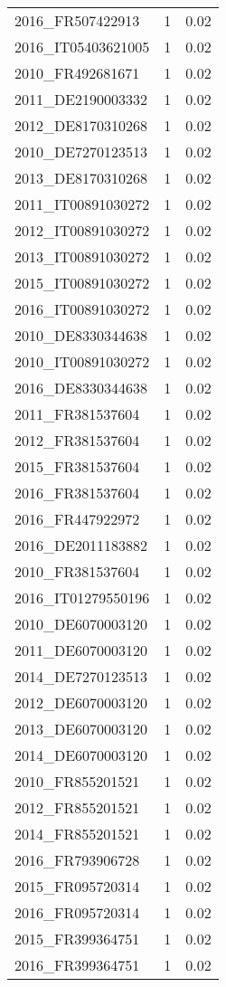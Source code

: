 \begin{table*}[htbp]
\begin{tabular}{lrr}
2016_FR507422913 & 1 & 0.02 \\
2016_IT05403621005 & 1 & 0.02 \\
2010_FR492681671 & 1 & 0.02 \\
2011_DE2190003332 & 1 & 0.02 \\
2012_DE8170310268 & 1 & 0.02 \\
2010_DE7270123513 & 1 & 0.02 \\
2013_DE8170310268 & 1 & 0.02 \\
2011_IT00891030272 & 1 & 0.02 \\
2012_IT00891030272 & 1 & 0.02 \\
2013_IT00891030272 & 1 & 0.02 \\
2015_IT00891030272 & 1 & 0.02 \\
2016_IT00891030272 & 1 & 0.02 \\
2010_DE8330344638 & 1 & 0.02 \\
2010_IT00891030272 & 1 & 0.02 \\
2016_DE8330344638 & 1 & 0.02 \\
2011_FR381537604 & 1 & 0.02 \\
2012_FR381537604 & 1 & 0.02 \\
2015_FR381537604 & 1 & 0.02 \\
2016_FR381537604 & 1 & 0.02 \\
2016_FR447922972 & 1 & 0.02 \\
2016_DE2011183882 & 1 & 0.02 \\
2010_FR381537604 & 1 & 0.02 \\
2016_IT01279550196 & 1 & 0.02 \\
2010_DE6070003120 & 1 & 0.02 \\
2011_DE6070003120 & 1 & 0.02 \\
2014_DE7270123513 & 1 & 0.02 \\
2012_DE6070003120 & 1 & 0.02 \\
2013_DE6070003120 & 1 & 0.02 \\
2014_DE6070003120 & 1 & 0.02 \\
2010_FR855201521 & 1 & 0.02 \\
2012_FR855201521 & 1 & 0.02 \\
2014_FR855201521 & 1 & 0.02 \\
2016_FR793906728 & 1 & 0.02 \\
2015_FR095720314 & 1 & 0.02 \\
2016_FR095720314 & 1 & 0.02 \\
2015_FR399364751 & 1 & 0.02 \\
2016_FR399364751 & 1 & 0.02 \\

\end{tabular}
\end{table*}
